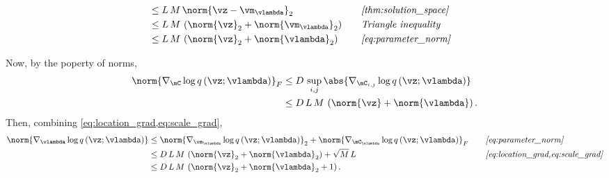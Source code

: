 \begin{proofEnd}
\begin{alignat}{2}
    \nonumber
    \\
    &\leq
    L \,
    M \,
    \norm{
    \vz - \vm_{\vlambda}
    }_2
    &&\quad\text{\textit{\cref{thm:solution_space}}}
    \nonumber
    \\
    &\leq
    L \,
    M \,\left(
    \norm{\vz}_2 + \norm{\vm_{\vlambda}}_2
    \right)
    &&\quad\text{\textit{Triangle inequality}}
    \nonumber
    \\
    &\leq
    L \,
    M \, \left(
    \norm{\vz}_2 + \norm{\vlambda}_2
    \right)
    &&\quad\text{\textit{\cref{eq:parameter_norm}}}
    \nonumber
  \end{alignat}

  Now, by the poperty of norms,
  \begin{alignat}{2}
    \norm{
      \nabla_{\mC} \log q\left(\vz; \vlambda\right)
    }_{F}
    &\leq
    D \,
    \sup_{i,j}
    \abs{
      \nabla_{\mC_{i,j}} \log q\left(\vz; \vlambda\right)
    }
    \nonumber
    \\
    &\leq
    D \,
    L \,
    M \, \left(
    \norm{\vz} + \norm{\vlambda}
    \right).
    \label{eq:scale_grad}
  \end{alignat}
  Then, combining \cref{eq:location_grad,eq:scale_grad}, 
  \begin{alignat}{2}
    \norm{
      \nabla_{\vlambda} \log q\left(\vz; \vlambda\right)
    }
    &\leq
    \norm{
      \nabla_{\vm_{\vlambda}} \log q\left(\vz; \vlambda\right)
    }_2
    +
    \norm{
      \nabla_{\mC_{\vlambda}} \log q\left(\vz; \vlambda\right)
    }_{F} 
    &&\quad\text{\textit{\cref{eq:parameter_norm}}}
    \nonumber
    \\
    &\leq
    D \,
    L \,
    M \, \left(
    \norm{\vz}_2 + \norm{\vlambda}_2
    \right)
    +
    \sqrt{M} \, L
    &&\quad\text{\textit{\cref{eq:location_grad,eq:scale_grad}}}
    \nonumber
    \\
    &\leq
    D \,
    L \,
    M \, \left(
    \norm{\vz}_2 + \norm{\vlambda}_2
    +
    1 
    \right).
    \nonumber
  \end{alignat}
\end{proofEnd}

